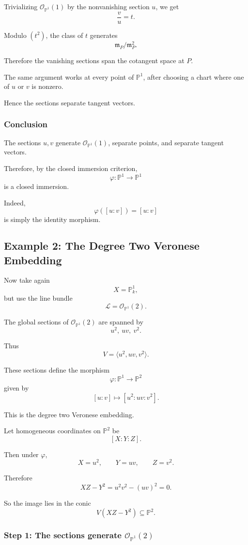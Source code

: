 \documentclass[12pt,a4paper]{article}
\theoremstyle{notespace}
\begin{document}
Trivializing \(\mathcal O_{\mathbb P^1}(1)\) by the nonvanishing section
\(u\), we get
\[
\frac vu=t.
\]

Modulo \((t^2)\), the class of \(t\) generates
\[
\mathfrak m_P/\mathfrak m_P^2.
\]

Therefore the vanishing sections span the cotangent space at \(P\).

The same argument works at every point of \(\mathbb P^1\), after choosing a
chart where one of \(u\) or \(v\) is nonzero.

Hence the sections separate tangent vectors.

\subsubsection*{Conclusion}

The sections \(u,v\) generate \(\mathcal O_{\mathbb P^1}(1)\), separate
points, and separate tangent vectors.

Therefore, by the closed immersion criterion,
\[
\varphi:\mathbb P^1\to\mathbb P^1
\]
is a closed immersion.

Indeed,
\[
\boxed{
	\varphi([u:v])=[u:v]
}
\]
is simply the identity morphism.

\subsection{Example 2: The Degree Two Veronese Embedding}

Now take again
\[
X=\mathbb P^1_k,
\]
but use the line bundle
\[
\mathcal L=\mathcal O_{\mathbb P^1}(2).
\]

The global sections of \(\mathcal O_{\mathbb P^1}(2)\) are spanned by
\[
u^2,\ uv,\ v^2.
\]

Thus
\[
V=\langle u^2,uv,v^2\rangle.
\]

These sections define the morphism
\[
\varphi:\mathbb P^1\to\mathbb P^2
\]
given by
\[
[u:v]\longmapsto [u^2:uv:v^2].
\]

This is the degree two Veronese embedding.

Let homogeneous coordinates on \(\mathbb P^2\) be
\[
[X:Y:Z].
\]

Then under \(\varphi\),
\[
X=u^2,
\qquad
Y=uv,
\qquad
Z=v^2.
\]

Therefore
\[
XZ-Y^2
=
u^2v^2-(uv)^2
=
0.
\]

So the image lies in the conic
\[
V(XZ-Y^2)\subseteq\mathbb P^2.
\]

\subsubsection*{Step 1: The sections generate \(\mathcal O_{\mathbb P^1}(2)\)}
\end{document}
